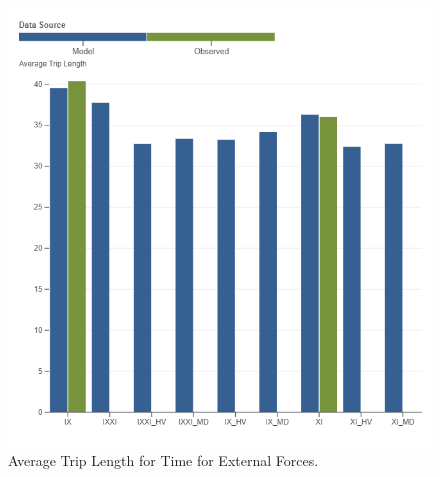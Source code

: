 \documentclass[
  letterpaper,
  DIV=11,
  numbers=noendperiod]{scrreprt}
\begin{document}
\begin{figure}[H]

{\centering \includegraphics[width=\textwidth,height=0.4\textheight]{v9x/v900/validation/_pictures/5-plot8.png}

}

\caption{\label{fig-pdf-time-ext}Average Trip Length for Time for
External Forces.}

\end{figure}
\end{document}
